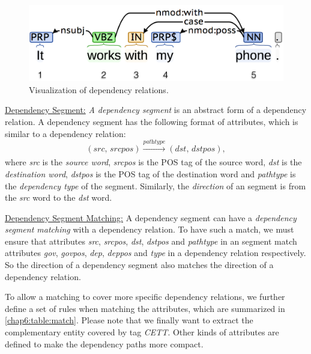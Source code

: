 \begin{figure} %
   \centering
   \includegraphics[width=5.in]{fig/bd16_coreNLP.png} 
   \caption{Visualization of dependency relations.}
   \label{chap6:fig:dt}
\end{figure}

\underline{Dependency Segment:} \label{chap6:defn:seg} 
\emph{A dependency segment} is an abstract form of a dependency relation. A dependency segment has the following format of attributes, which is similar to a dependency relation: 
$$(\textit{src, srcpos})\xrightarrow[]{\textit{pathtype}}(\textit{dst, dstpos}), $$
where \textit{src} is the \textit{source word}, \textit{srcpos} is the POS tag of the source word, \textit{dst} is the \textit{destination word}, \textit{dstpos} is the POS tag of the destination word and \textit{pathtype} is the \textit{dependency type} of the segment. Similarly, the \emph{direction} of an segment is from the \textit{src} word to the \textit{dst} word.

\underline{Dependency Segment Matching:} \label{chap6:defn:match} 
A dependency segment can have a \emph{dependency segment matching} with a dependency relation. To have such a match, we must ensure that attributes \textit{src}, \textit{srcpos}, \textit{dst}, \textit{dstpos} and \textit{pathtype} in an segment match attributes \textit{gov}, \textit{govpos}, \textit{dep}, \textit{deppos} and \textit{type} in a dependency relation respectively. So the direction of a dependency segment also matches the direction of a dependency relation.

To allow a matching to cover more specific dependency relations, we further define a set of rules when matching the attributes, which are summarized in \ref{chap6:table:match}. Please note that we finally want to extract the complementary entity covered by tag \textit{CETT}. Other kinds of attributes are defined to make the dependency paths more compact.

